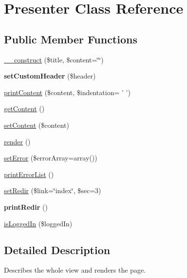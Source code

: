 \hypertarget{classPresenter}{\section{Presenter Class Reference}
\label{classPresenter}
}
\subsection*{Public Member Functions}
\begin{DoxyCompactItemize}
\item 
\hyperlink{classPresenter_a24c04a54ce929bc12219f037a794d439}{\+\_\+\+\_\+construct} (\$title, \$content=\char`\"{}\char`\"{})
\item 
\hypertarget{classPresenter_a299e31916fc252227e369fc5efad77f9}{{\bfseries set\+Custom\+Header} (\$header)}\label{classPresenter_a299e31916fc252227e369fc5efad77f9}

\item 
\hyperlink{classPresenter_a327ab1b725813be28114753935b42cd4}{print\+Content} (\$content, \$indentation= ' ')
\item 
\hyperlink{classPresenter_a8a9d11db6633e0ebb898abd4580f8988}{get\+Content} ()
\item 
\hyperlink{classPresenter_a9a7d0d294934548d13620baca0657087}{set\+Content} (\$content)
\item 
\hyperlink{classPresenter_a2194a46cf6c23dd4e483f1ee63bc2236}{render} ()
\item 
\hyperlink{classPresenter_a1d66815ed950c7362a9c87bbcc6d9b7b}{set\+Error} (\$error\+Array=array())
\item 
\hyperlink{classPresenter_a5e4fe61038c5535719c6d7bc3b557019}{print\+Error\+List} ()
\item 
\hyperlink{classPresenter_a517ff93f6c099065a0d67c0994f0b76b}{set\+Redir} (\$link=\char`\"{}index\char`\"{}, \$sec=3)
\item 
\hypertarget{classPresenter_ace2a8a72ee53e6be953614d00e29f741}{{\bfseries print\+Redir} ()}\label{classPresenter_ace2a8a72ee53e6be953614d00e29f741}

\item 
\hyperlink{classPresenter_af0b057b552ee1d7c4a3cce5f9777f3c9}{is\+Logged\+In} (\$logged\+In)
\end{DoxyCompactItemize}


\subsection{Detailed Description}
Describes the whole view and renders the page.

